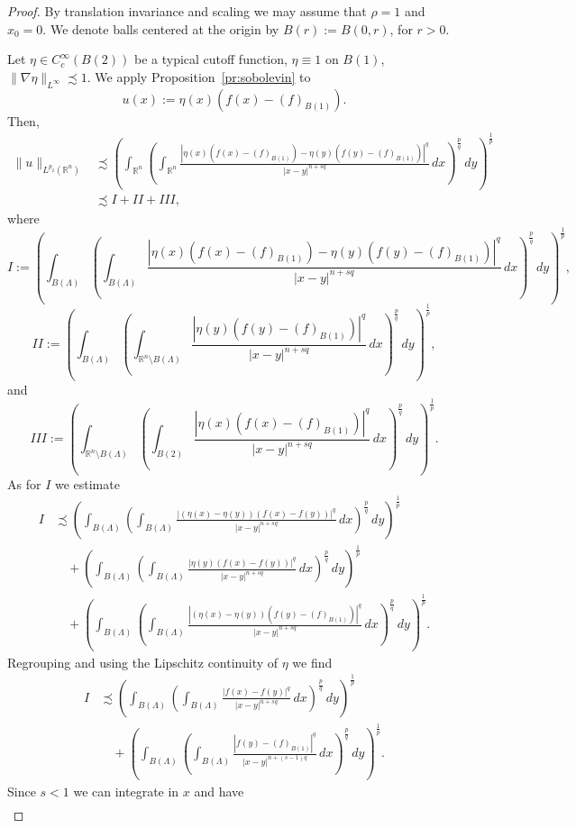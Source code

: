 \documentclass[12pt]{amsart}
\theoremstyle{definition}
\newcommand{\R}{\mathbb{R}}
\newcommand{\brac}[1]{\left (#1 \right )}
\numberwithin{theorem}{section} \numberwithin{equation}{section}
\newcommand{\aleq}{\precsim}
\begin{document}
% 
\begin{proof}
By translation invariance and scaling we may assume that $\rho = 1$ and $x_0 = 0$. We denote balls centered at the origin by $B(r) := B(0,r)$, for $r > 0$.

Let $\eta \in C_c^\infty(B(2))$ be a typical cutoff function, $\eta\equiv1$ on $B(1)$, $\|\nabla\eta \|_{L^\infty} \aleq 1$. We apply Proposition~\ref{pr:sobolevin} to \[u(x) := \eta(x)(f(x)-(f)_{B(1)}).\] Then,
 \[
  \begin{split}
   \|u\|_{L^{p_2}({\R^n})} &\aleq \brac{\int_{\R^n}\brac{\int_{\R^n} \frac{|\eta(x)(f(x)-(f)_{B(1)})-\eta(y)(f(y)-(f)_{B(1)})|^q}{|x-y|^{n+sq}}\, dx}^{\frac{p}{q}}\, dy}^{\frac{1}{p}}\\
  &\aleq I + II + III,
  \end{split}
 \]
where
\[
    I := \brac{\int_{B(\Lambda )}\brac{\int_{B(\Lambda )} \frac{|\eta(x)(f(x)-(f)_{B(1)})-\eta(y)(f(y)-(f)_{B(1)})|^q}{|x-y|^{n+sq}}\, dx}^{\frac{p}{q}}\, dy}^{\frac{1}{p}},
\]
\[
    II := \brac{\int_{B(\Lambda )}\brac{\int_{\R^n\setminus B(\Lambda )} \frac{|\eta(y)(f(y)-(f)_{B(1)})|^q}{|x-y|^{n+sq}}\, dx}^{\frac{p}{q}}\, dy}^{\frac{1}{p}},
\]
and
\[   
   III:= \brac{\int_{\R^n\setminus B(\Lambda )}\brac{\int_{B(2)} \frac{|\eta(x)(f(x)-(f)_{B(1)})|^q}{|x-y|^{n+sq}}\, dx}^{\frac{p}{q}}\, dy}^{\frac{1}{p}}.
\]
% 
As for $I$ we estimate
% 
\[
 \begin{split}
  I&\aleq 
   \brac{\int_{B(\Lambda )}\brac{\int_{B(\Lambda )} \frac{|(\eta(x)-\eta(y))(f(x)-f(y))|^q}{|x-y|^{n+sq}}\, dx}^{\frac{p}{q}}\, dy}^{\frac{1}{p}}\\
&\quad+  \brac{\int_{B(\Lambda )}\brac{\int_{B(\Lambda )} \frac{|\eta(y)(f(x)-f(y))|^q}{|x-y|^{n+sq}}\, dx}^{\frac{p}{q}}\, dy}^{\frac{1}{p}}\\
 &\quad + \brac{\int_{B(\Lambda )}\brac{\int_{B(\Lambda )} \frac{|(\eta(x)-\eta(y))(f(y)-(f)_{B(1)})|^q}{|x-y|^{n+sq}}\, dx}^{\frac{p}{q}}\, dy}^{\frac{1}{p}}.
\end{split}
\]
Regrouping and using the Lipschitz continuity of $\eta$ we find
\[
\begin{split}
 I &\aleq \brac{\int_{B(\Lambda )}\brac{\int_{B(\Lambda )} \frac{|f(x)-f(y)|^q}{|x-y|^{n+sq}}\, dx}^{\frac{p}{q}}\, dy}^{\frac{1}{p}}\\
  &\quad + \brac{\int_{B(\Lambda )}\brac{\int_{B(\Lambda )} \frac{|f(y)-(f)_{B(1)}|^q}{|x-y|^{n+(s-1)q}}\, dx}^{\frac{p}{q}}\, dy}^{\frac{1}{p}}.
 \end{split}
\]
Since $s<1$ we can integrate in $x$ and have
\[
 \begin{split}

\end{split}\]
\end{proof}
\end{document}
